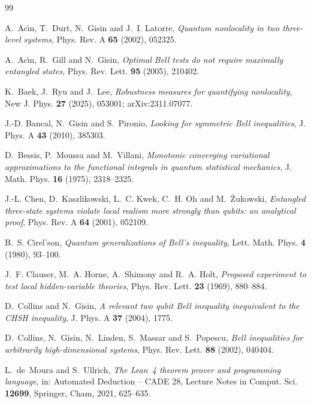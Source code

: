 \documentclass[11pt]{article}
\theoremstyle{remark}
\numberwithin{equation}{section}
\begin{document}
\begin{thebibliography}{99}
\footnotesize\sloppy
\setlength{\itemsep}{0pt}

A.~Ac\'{\i}n, T.~Durt, N.~Gisin and J.~I. Latorre, \emph{Quantum nonlocality in two three-level systems}, Phys. Rev. A
\textbf{65} (2002), 052325.

A.~Ac\'{\i}n, R.~Gill and N.~Gisin, \emph{Optimal Bell tests do not require maximally entangled states}, Phys. Rev.
Lett. \textbf{95} (2005), 210402.

K.~Baek, J.~Ryu and J.~Lee, \emph{Robustness measures for quantifying nonlocality}, New J. Phys. \textbf{27} (2025),
053001; arXiv:2311.07077.

J.-D. Bancal, N.~Gisin and S.~Pironio, \emph{Looking for symmetric Bell inequalities}, J. Phys. A \textbf{43} (2010),
385303.

D.~Bessis, P.~Moussa and M.~Villani, \emph{Monotonic converging variational approximations to the functional integrals
in quantum statistical mechanics}, J. Math. Phys. \textbf{16} (1975), 2318--2325.

J.-L. Chen, D.~Kaszlikowski, L.~C. Kwek, C.~H. Oh and M.~\.Zukowski, \emph{Entangled three-state systems violate local
realism more strongly than qubits: an analytical proof}, Phys. Rev. A \textbf{64} (2001), 052109.

B.~S. Cirel'son, \emph{Quantum generalizations of Bell's inequality}, Lett. Math. Phys. \textbf{4} (1980), 93--100.

J.~F. Clauser, M.~A. Horne, A.~Shimony and R.~A. Holt, \emph{Proposed experiment to test local hidden-variable
theories}, Phys. Rev. Lett. \textbf{23} (1969), 880--884.

D.~Collins and N.~Gisin, \emph{A relevant two qubit Bell inequality inequivalent to the CHSH inequality}, J. Phys. A
\textbf{37} (2004), 1775.

D.~Collins, N.~Gisin, N.~Linden, S.~Massar and S.~Popescu, \emph{Bell inequalities for arbitrarily high-dimensional
systems}, Phys. Rev. Lett. \textbf{88} (2002), 040404.

L.~de~Moura and S.~Ullrich, \emph{The Lean~4 theorem prover and programming language}, in: Automated Deduction -- CADE
28, Lecture Notes in Comput. Sci. \textbf{12699}, Springer, Cham, 2021, 625--635.


\end{thebibliography}
\end{document}
